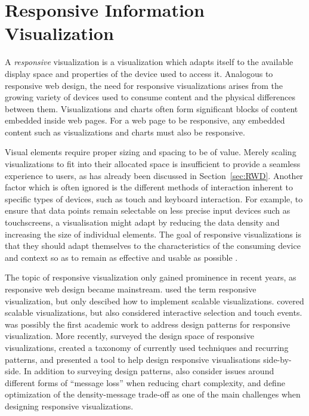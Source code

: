 
\chapter{Responsive Information Visualization}
\label{chap:ResponsiveInformationVisualization}

A \emph{responsive} visualization is a visualization which adapts
itself to the available display space and properties of the device
used to access it. Analogous to responsive web design, the need for
responsive visualizations arises from the growing variety of devices
used to consume content and the physical differences between them.
Visualizations and charts often form significant blocks of content
embedded inside web pages. For a web page to be responsive, any
embedded content such as visualizations and charts must also be
responsive.

Visual elements require proper sizing and spacing to be of
value. Merely scaling visualizations to fit into their allocated space
is insufficient to provide a seamless experience to users, as has
already been discussed in Section~\ref{sec:RWD}. Another factor which
is often ignored is the different methods of interaction inherent to
specific types of devices, such as touch and keyboard interaction. For
example, to ensure that data points remain selectable on less precise
input devices such as touchscreens, a visualisation might adapt by
reducing the data density and increasing the size of individual
elements. The goal of responsive visualizations is that they should
adapt themselves to the characteristics of the consuming device and
context so as to remain as effective and usable as possible
\parencite{DesignPatternsTradeOffsRespVis}.


The topic of responsive visualization only gained prominence in recent
years, as responsive web design became mainstream.
\textcite{BuildingRespDataVisForTheWeb} used the term responsive
visualization, but only descibed how to implement scalable
visualizations. \textcite{LearningRespDataVis} covered scalable
visualizations, but also considered interactive selection and touch
events. \textcite{RespVis} was possibly the first academic work to
address design patterns for responsive visualization.
%
More recently, \parencite{TechniquesForFlexibleRespVisDesign} surveyed
the design space of responsive visualizations, created a taxonomy of
currently used techniques and recurring patterns, and presented a tool
to help design responsive visualisations side-by-side. In addition to
surveying design patterns, \textcite{DesignPatternsTradeOffsRespVis}
also consider issues around different forms of \enquote{message loss}
when reducing chart complexity, and define optimization of the
density-message trade-off as one of the main challenges when designing
responsive visualizations.





